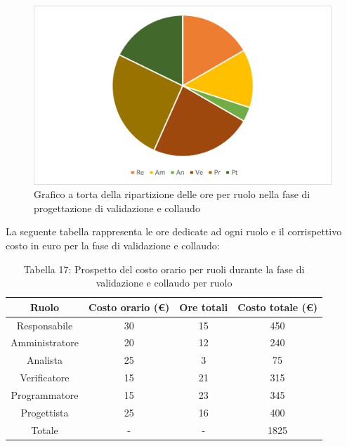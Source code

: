 \begin{figure}[H]
    \centering
    \includegraphics[scale=0.6]{img/grafi preventivo/torta/validazione/complessivo.png}
    \caption{Grafico a torta della ripartizione delle ore per ruolo nella fase di progettazione di validazione e collaudo}
\end{figure}
La seguente tabella rappresenta le ore dedicate ad ogni ruolo e il corrispettivo costo in euro per la fase di validazione e collaudo:
\begin{table}[h]
	\setlength\extrarowheight{5pt}
	\centering
	\begin{tabularx}{\textwidth}{|ccc|c|}
		\hline
		\rowcolor{white}
		\textbf{Ruolo} & \textbf{Costo orario (€)} & \textbf{Ore totali} & \textbf{Costo totale (€)} \\
		\hline
		Responsabile &30&15&450 \\
		Amministratore &20&12&240 \\
		Analista &25&3&75 \\
		Verificatore &15&21&315 \\
		Programmatore &15&23&345 \\
		Progettista &25&16&400 \\
		\hline
		Totale &-&-&1825 \\
		\hline
	\end{tabularx}
    \vspace{10pt}
	\caption{Tabella 17: Prospetto del costo orario per ruoli durante la fase di validazione e collaudo per ruolo}
\end{table}
%

